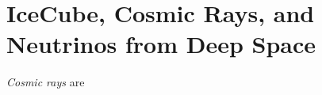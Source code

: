 \documentclass[../../../main.tex]{subfiles}
\begin{document}
\section{IceCube, Cosmic Rays, and Neutrinos from Deep Space}
\label{sec:professional}

\textit{Cosmic rays} are
\end{document}
